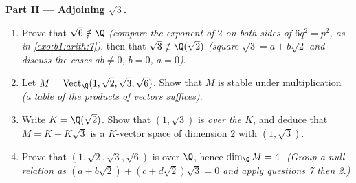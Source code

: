 \begin{problem}
\medskip
\noindent\textbf{Part II --- Adjoining $\sqrt3$.}
\begin{enumerate}[resume]
  \item Prove that $\sqrt6 \notin \Q$ \emph{(compare the exponent
        of $2$ on both sides of $6q^2 = p^2$, as in
        \cref{exo:b1:arith:7})}, then that $\sqrt3 \notin
        \Q(\sqrt2)$ \emph{(square $\sqrt3 = a + b\sqrt2$ and
        discuss the cases $ab \neq 0$, $b = 0$, $a = 0$)}.
  \item Let $M = \operatorname{Vect}_\Q(1, \sqrt2, \sqrt3,
        \sqrt6)$. Show that $M$ is stable under multiplication
        \emph{(a table of the products of  vectors
        suffices)}.
  \item Write $K = \Q(\sqrt2)$. Show that $(1, \sqrt3)$ is 
        \emph{over the  $K$}, and deduce that $M = K +
        K\sqrt3$ is a $K$-vector space of dimension $2$ with
         $(1, \sqrt3)$.
  \item Prove that $(1, \sqrt2, \sqrt3, \sqrt6)$ is  over
        $\Q$, hence $\dim_\Q M = 4$. \emph{(Group a null relation
        as $(a + b\sqrt2) + (c + d\sqrt2)\sqrt3 = 0$ and apply
        questions 7 then 2.)}
\end{enumerate}


\end{problem}
